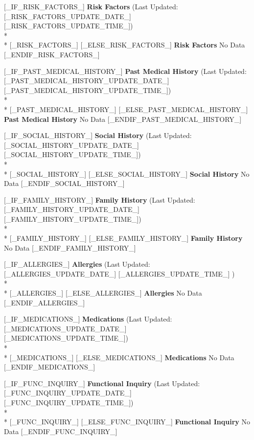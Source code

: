 \documentclass[10pt,letterpaper]{letter}
\begin{document}
[_IF_RISK_FACTORS_]
\Large\textbf{Risk Factors} \small{(Last Updated: [_RISK_FACTORS_UPDATE_DATE_] [_RISK_FACTORS_UPDATE_TIME_])}
\\*\\*
\small{[_RISK_FACTORS_]}
[_ELSE_RISK_FACTORS_]
\Large\textbf{Risk Factors} \small{No Data}
[_ENDIF_RISK_FACTORS_]

[_IF_PAST_MEDICAL_HISTORY_]
\Large\textbf{Past Medical History} \small{(Last Updated: [_PAST_MEDICAL_HISTORY_UPDATE_DATE_] [_PAST_MEDICAL_HISTORY_UPDATE_TIME_])}
\\*\\*
\small{[_PAST_MEDICAL_HISTORY_]}
[_ELSE_PAST_MEDICAL_HISTORY_]
\Large\textbf{Past Medical History} \small{No Data}
[_ENDIF_PAST_MEDICAL_HISTORY_]

[_IF_SOCIAL_HISTORY_]
\Large\textbf{Social History} \small{(Last Updated: [_SOCIAL_HISTORY_UPDATE_DATE_] [_SOCIAL_HISTORY_UPDATE_TIME_])}
\\*\\*
\small{[_SOCIAL_HISTORY_]}
[_ELSE_SOCIAL_HISTORY_]
\Large\textbf{Social History} \small{No Data}
[_ENDIF_SOCIAL_HISTORY_]

[_IF_FAMILY_HISTORY_]
\Large\textbf{Family History} \small{(Last Updated: [_FAMILY_HISTORY_UPDATE_DATE_] [_FAMILY_HISTORY_UPDATE_TIME_])}
\\*\\*
\small{[_FAMILY_HISTORY_]}
[_ELSE_FAMILY_HISTORY_]
\Large\textbf{Family History} \small{No Data}
[_ENDIF_FAMILY_HISTORY_]

[_IF_ALLERGIES_]
\Large\textbf{Allergies} \small{(Last Updated: [_ALLERGIES_UPDATE_DATE_] [_ALLERGIES_UPDATE_TIME_] )}
\\*\\*
\small{[_ALLERGIES_]}
[_ELSE_ALLERGIES_]
\Large\textbf{Allergies} \small{No Data}
[_ENDIF_ALLERGIES_]

[_IF_MEDICATIONS_]
\Large\textbf{Medications} \small{(Last Updated: [_MEDICATIONS_UPDATE_DATE_] [_MEDICATIONS_UPDATE_TIME_])}
\\*\\*
\small{[_MEDICATIONS_]}
[_ELSE_MEDICATIONS_]
\Large\textbf{Medications} \small{No Data}
[_ENDIF_MEDICATIONS_]

[_IF_FUNC_INQUIRY_]
\Large\textbf{Functional Inquiry} \small{(Last Updated: [_FUNC_INQUIRY_UPDATE_DATE_] [_FUNC_INQUIRY_UPDATE_TIME_])}
\\*\\*
\small{[_FUNC_INQUIRY_]}
[_ELSE_FUNC_INQUIRY_]
\Large\textbf{Functional Inquiry} \small{No Data}
[_ENDIF_FUNC_INQUIRY_]
\end{document}
